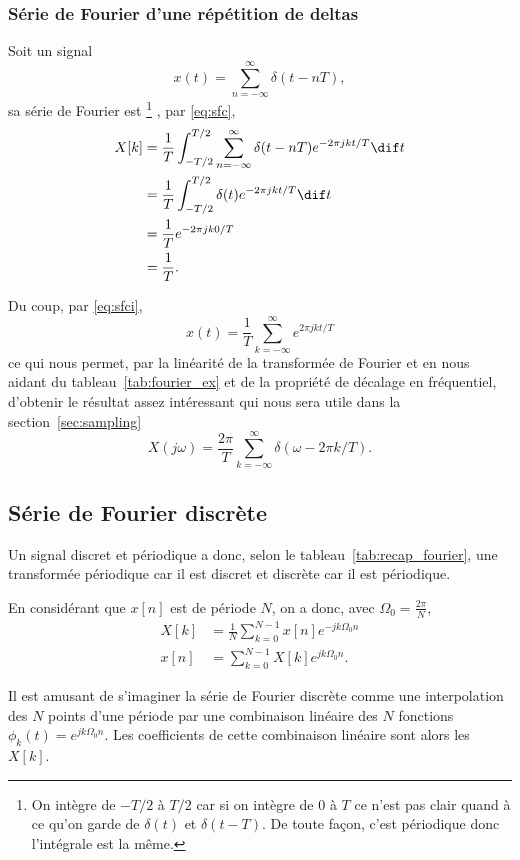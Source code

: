 \subsubsection{Série de Fourier d'une répétition de deltas}
\label{sec:deltas}
Soit un signal
\[ x(t) = \sum_{n=-\infty}^\infty \delta(t-nT), \]
sa série de Fourier est
\footnote{On intègre de $-T/2$ à $T/2$ car si on intègre
de $0$ à $T$ ce n'est pas clair quand à ce qu'on garde de $\delta(t)$ et
$\delta(t-T)$.
De toute façon, c'est périodique donc l'intégrale est la même.}
, par \eqref{eq:sfc},
\begin{align*}
  X[k] & = \frac{1}{T}\int_{-T/2}^{T/2} \sum_{n=-\infty}^\infty \delta(t-nT)
  e^{-2\pi jkt/T} \dif t\\
  & = \frac{1}{T}\int_{-T/2}^{T/2} \delta(t) e^{-2\pi jkt/T} \dif t\\
  & = \frac{1}{T} e^{-2\pi jk0/T}\\
  & = \frac{1}{T}.\\
\end{align*}

Du coup, par \eqref{eq:sfci},
\[ x(t) = \frac{1}{T}\sum_{k=-\infty}^\infty e^{2\pi jkt/T} \]
ce qui nous permet,
par la linéarité de la transformée de Fourier et en nous aidant du
tableau~\ref{tab:fourier_ex} et de la propriété de décalage en fréquentiel,
d'obtenir le résultat assez intéressant
qui nous sera utile dans la section~\ref{sec:sampling}
\[ X(j\omega) = \frac{2\pi}{T}
\sum_{k=-\infty}^\infty \delta(\omega-2\pi k/T). \]

\subsection{Série de Fourier discrète}
Un signal discret et périodique a donc,
selon le tableau~\ref{tab:recap_fourier}, une transformée
périodique car il est discret et discrète car il est périodique.

En considérant que $x[n]$ est de période $N$, on a donc,
avec $\Omega_0 = \frac{2\pi}{N}$,
\begin{align}
  \label{eq:sfd}
  X[k] & = \frac{1}{N} \sum_{k=0}^{N-1}x[n]e^{-jk\Omega_0n}\\
  \nonumber
  x[n] & = \sum_{k=0}^{N-1}X[k]e^{jk\Omega_0n}.
\end{align}

Il est amusant de s'imaginer la série de Fourier discrète
comme une interpolation des $N$ points d'une période par
une combinaison linéaire des $N$ fonctions $\phi_k(t) = e^{jk\Omega_0n}$.
Les coefficients de cette combinaison linéaire sont alors les $X[k]$.


